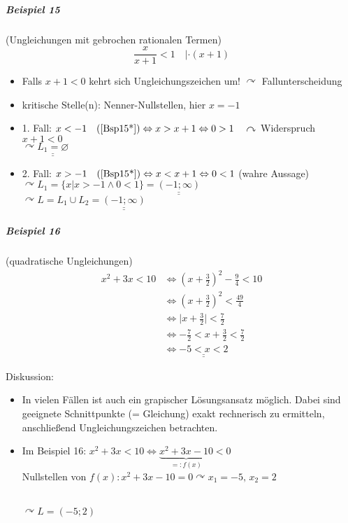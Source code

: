 \documentclass[a4paper]{scrartcl}
\begin{document}
\subparagraph{Beispiel 15} (Ungleichungen mit gebrochen rationalen Termen)
\begin{equation}\label{Bsp15*}
\frac{x}{x+1} < 1 \quad |\cdot (x+1)
\end{equation}
\begin{itemize}
\item Falls $x+1 <0$ kehrt sich Ungleichungszeichen um! $\curvearrowright$ Fallunterscheidung
\item kritische Stelle(n): Nenner-Nullstellen, hier $x=-1$
\item 1. Fall: $x<-1 \quad (\ref{Bsp15*}) \Leftrightarrow x > x+1 \Leftrightarrow 0 > 1 \quad \curvearrowright$ Widerspruch\\
$x+1 < 0$\\
$\curvearrowright \underline{\underline{L_1 = \varnothing}}$

\item 2. Fall: $x > -1 \quad (\ref{Bsp15*}) \Leftrightarrow x < x+1 \Leftrightarrow 0 < 1$ (wahre Aussage)\\
$\curvearrowright L_1=\{ x | x > -1\wedge 0 < 1 \} = \underline{\underline{(-1;\infty)}}$\\
$\curvearrowright L = L_1 \cup L_2 = \underline{\underline{(-1;\infty)}}$ 
\end{itemize}

\subparagraph{Beispiel 16} (quadratische Ungleichungen)
\begin{align*}
x^2 + 3x < 10 &\Leftrightarrow (x+\frac{3}{2} )^2 - \frac{9}{4} < 10\\
&\Leftrightarrow (x + \frac{3}{2} )^2 < \frac{49}{4}\\
&\Leftrightarrow \lvert x + \frac{3}{2} \rvert < \frac{7}{2}\\
&\Leftrightarrow -\frac{7}{2} < x + \frac{3}{2} < \frac{7}{2}\\
&\Leftrightarrow \underline{\underline{-5 < x < 2}}
\end{align*}

Diskussion:
\begin{itemize}
\item In vielen Fällen ist auch ein grapischer Lösungsansatz möglich. Dabei sind geeignete Schnittpunkte (= Gleichung) exakt rechnerisch zu ermitteln, anschließend Ungleichungszeichen betrachten.
\item Im Beispiel 16: $x^2 + 3x < 10 \Leftrightarrow \underbrace{x^2 + 3x -10}_{=: f(x)} < 0$\\
Nullstellen von $f(x): x^2 + 3x -10 = 0 \curvearrowright x_1 = -5, \, x_2 = 2$\\
\\
$\curvearrowright L=(-5;2)$

\end{itemize}
\end{document}
